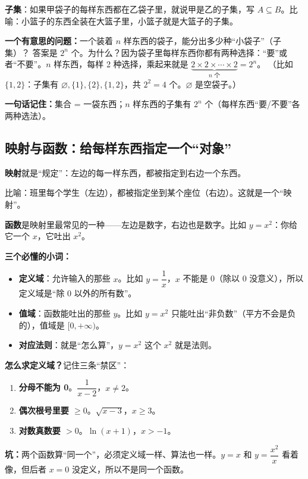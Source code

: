 ﻿\documentclass[11pt,a4paper,UTF8]{ctexart}
\newcommand{\idea}[1]{\par\smallskip\noindent\colorbox{yellow!22}{\textbf{一句话记住：}#1}\par\smallskip}
\newcommand{\warn}[1]{\par\smallskip\noindent\textcolor{red!70!black}{\textbf{坑：}#1}\par\smallskip}
\begin{document}
\textbf{子集}：如果甲袋子的每样东西都在乙袋子里，就说甲是乙的子集，写 $A\subseteq B$。比喻：小篮子的东西全装在大篮子里，小篮子就是大篮子的子集。

\textbf{一个有意思的问题：}一个装着 $n$ 样东西的袋子，能分出多少种“小袋子”（子集）？
答案是 $2^n$ 个。为什么？因为袋子里每样东西你都有两种选择：“要”或者“不要”。$n$ 样东西，每样 2 种选择，乘起来就是 $\underbrace{2\times2\times\cdots\times2}_{n\text{ 个}}=2^n$。
（比如 $\{1,2\}$：子集有 $\varnothing,\{1\},\{2\},\{1,2\}$，共 $2^2=4$ 个。$\varnothing$ 是空袋子。）

\idea{集合 = 一袋东西；$n$ 样东西的子集有 $2^n$ 个（每样东西“要/不要”各两种选法）。}

\subsection{映射与函数：给每样东西指定一个“对象”}

\textbf{映射}就是“规定”：左边的每一样东西，都被指定到右边一个东西。

比喻：班里每个学生（左边），都被指定坐到某个座位（右边）。这就是一个“映射”。

\textbf{函数}是映射里最常见的一种——左边是数字，右边也是数字。比如 $y=x^2$：你给它一个 $x$，它吐出 $x^2$。

\textbf{三个必懂的小词：}
\begin{itemize}[leftmargin=1.4em]
\item \textbf{定义域}：允许输入的那些 $x$。比如 $y=\dfrac1x$，$x$ 不能是 0（除以 0 没意义），所以定义域是“除 0 以外的所有数”。
\item \textbf{值域}：函数能吐出的那些 $y$。比如 $y=x^2$ 只能吐出“非负数”（平方不会是负的），值域是 $[0,+\infty)$。
\item \textbf{对应法则}：就是“怎么算”，$y=x^2$ 这个 $x^2$ 就是法则。
\end{itemize}

\textbf{怎么求定义域？}记住三条“禁区”：
\begin{enumerate}[leftmargin=1.4em]
\item \textbf{分母不能为 0}。$\dfrac1{x-2}$，$x\ne2$。
\item \textbf{偶次根号里要 $\ge0$}。$\sqrt{x-3}$，$x\ge3$。
\item \textbf{对数真数要 $>0$}。$\ln(x+1)$，$x>-1$。
\end{enumerate}

\warn{两个函数算“同一个”，必须定义域一样、算法也一样。$y=x$ 和 $y=\dfrac{x^2}{x}$ 看着像，但后者 $x=0$ 没定义，所以不是同一个函数。}
\end{document}
